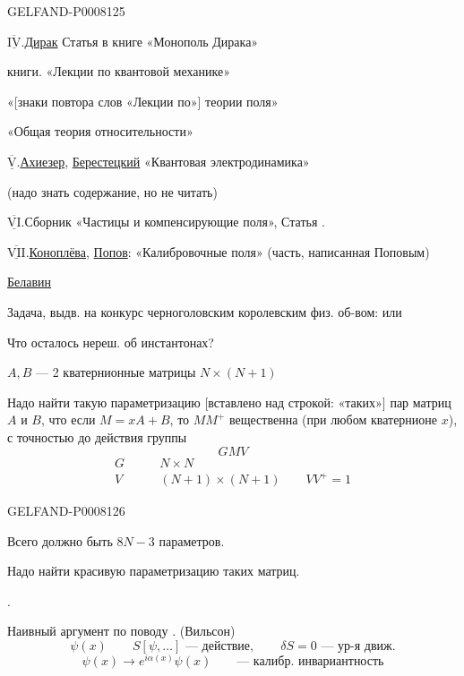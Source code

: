 \begin{GelfandAdjacentEvidence}{GELFAND-P000812}{5}


\(\overline{\underline{\mathrm{IV}}}\).\quad \uline{Дирак} Статья в книге «Монополь Дирака»

\hspace{1em}книги. «Лекции по квантовой механике»

\hspace{1em}«[знаки повтора слов «Лекции по»] теории поля»

\hspace{1em}«Общая теория относительности»

\(\overline{\underline{\mathrm{V}}}\).\quad \uline{Ахиезер}, \uline{Берестецкий} «Квантовая электродинамика»

\hspace{1em}(надо знать содержание, но не читать)

\(\overline{\underline{\mathrm{VI}}}\).\quad Сборник «Частицы и компенсирующие поля», Статья .

\(\overline{\underline{\mathrm{VII}}}\).\quad \uline{Коноплёва}, \uline{Попов}: «Калибровочные поля» (часть, написанная Поповым)

\uline{Белавин}

Задача, выдв. на конкурс черноголовским королевским физ. об-вом: или

Что осталось нереш. об инстантонах?

\(A,B\) — 2 кватернионные матрицы \(N\times(N+1)\)

Надо найти такую параметризацию [вставлено над строкой: «таких»] пар матриц \(A\) и \(B\), что
если \(M=xA+B\), то \(MM^+\) вещественна (при любом кватернионе \(x\)),
с точностью до действия группы
\[
GMV
\]
\[
\begin{aligned}
G&\qquad N\times N\\
V&\qquad (N+1)\times(N+1)\qquad VV^+=1
\end{aligned}
\]
\end{GelfandAdjacentEvidence}
\begin{GelfandAdjacentEvidence}{GELFAND-P000812}{6}


Всего должно быть \(8N-3\) параметров.

Надо найти красивую параметризацию таких матриц.

.

Наивный аргумент по поводу . (Вильсон)
\[
\psi(x)\qquad S[\psi,\ldots]\text{ — действие},
\qquad \delta S=0\text{ — ур-я движ.}
\]
\[
\psi(x)\longrightarrow e^{i\alpha(x)}\psi(x)
\qquad\text{— калибр. инвариантность}
\]
\end{GelfandAdjacentEvidence}



